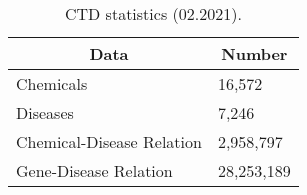 \begin{table}[ht]
\caption{CTD statistics (02.2021).}
\vspace{0.25em}
\centering
\begin{tabular}{|l|l|}
\hline
\multicolumn{1}{|c|}{\textbf{Data}} & \multicolumn{1}{c|}{\textbf{Number}} \\ \hline
Chemicals                  & 16,572                      \\ \hline
Diseases                   & 7,246                       \\ \hline
Chemical-Disease Relation  & 2,958,797                   \\ \hline
Gene-Disease Relation      & 28,253,189                  \\ \hline
\end{tabular}
\label{tab:ctd_stats}
\end{table}